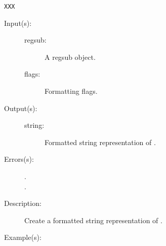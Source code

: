 \begin{description}
\begin{description}
\begin{verbatim}
XXX
		\end{verbatim}
	\end{description}
\label{outputsdict:regsubtype}
\item[{\onyxop{regsub flags}{regsubtype}{string}}: ]
	\begin{description}\item[]
	\item[Input(s): ]
		\begin{description}\item[]
		\item[regsub: ]
			A regsub object.
		\item[flags: ]
			Formatting flags.
		\end{description}
	\item[Output(s): ]
		\begin{description}\item[]
		\item[string: ]
			Formatted string representation of .
		\end{description}
	\item[Errors(s): ]
		\begin{description}\item[]
		\item[.]
		\item[.]
		\end{description}
	\item[Description: ]
		Create a formatted string representation of .
	\item[Example(s): ]\begin{verbatim}


\end{verbatim}
\end{description}
\end{description}
